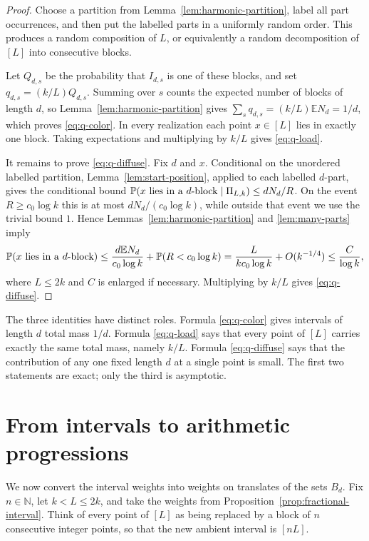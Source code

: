 \documentclass[10pt,a4paper]{amsart}
\numberwithin{equation}{section}
\newcommand{\N}{\mathbb{N}}
\newcommand{\E}{\mathbb{E}}
\newcommand{\Prob}{\mathbb{P}}
\begin{document}
\begin{proof}
Choose a partition from Lemma~\ref{lem:harmonic-partition}, label all part
occurrences, and then put the labelled parts in a uniformly random order.  This
produces a random composition of $L$, or equivalently a random decomposition of
$[L]$ into consecutive blocks.

Let $Q_{d,s}$ be the probability that $I_{d,s}$ is one of these blocks, and set
$q_{d,s}=(k/L)Q_{d,s}$.  Summing over $s$ counts the expected number of blocks
of length $d$, so Lemma~\ref{lem:harmonic-partition} gives
$\sum_s q_{d,s}=(k/L)\E N_d=1/d$, which proves \eqref{eq:q-color}.  In every
realization each point $x\in[L]$ lies in exactly one block.  Taking
expectations and multiplying by $k/L$ gives \eqref{eq:q-load}.

It remains to prove \eqref{eq:q-diffuse}.  Fix $d$ and $x$.  Conditional on
the unordered labelled partition, Lemma~\ref{lem:start-position}, applied to
each labelled $d$-part, gives the conditional bound
$\Prob(x\hbox{ lies in a $d$-block}\mid\Pi_{L,k})\le dN_d/R$.  On the event
$R\ge c_0\log k$ this is at most $dN_d/(c_0\log k)$, while outside that event
we use the trivial bound $1$.  Hence Lemmas~\ref{lem:harmonic-partition} and
\ref{lem:many-parts} imply
\[
 \Prob(x\hbox{ lies in a $d$-block})
 \le \frac{d\E N_d}{c_0\log k}+\Prob(R<c_0\log k)
 =\frac{L}{kc_0\log k}+O(k^{-1/4})
 \le \frac{C}{\log k},
\]
where $L\le2k$ and $C$ is enlarged if necessary.  Multiplying by $k/L$ gives
\eqref{eq:q-diffuse}.
\end{proof}

The three identities have distinct roles.  Formula \eqref{eq:q-color} gives
intervals of length $d$ total mass $1/d$.  Formula \eqref{eq:q-load} says that
every point of $[L]$ carries exactly the same total mass, namely $k/L$.
Formula \eqref{eq:q-diffuse} says that the contribution of any one fixed
length $d$ at a single point is small.  The first two statements are exact;
only the third is asymptotic.

\section{From intervals to arithmetic progressions}

We now convert the interval weights into weights on translates of the sets
$B_d$.  Fix $n\in\N$, let $k<L\le2k$, and take the weights from
Proposition~\ref{prop:fractional-interval}.  Think of every point of $[L]$ as
being replaced by a block of $n$ consecutive integer points, so that the new
ambient interval is $[nL]$.
\end{document}

